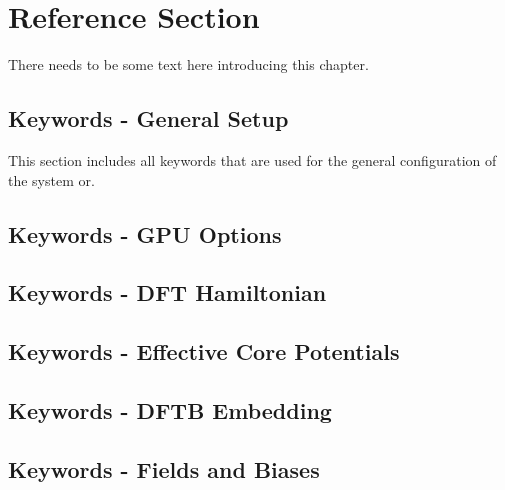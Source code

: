 \chapter{Reference Section}

There needs to be some text here introducing this chapter.

\section{Keywords - General Setup}

This section includes all keywords that are used for
the general configuration of the system or.


\newpage
\section{Keywords - GPU Options}


\newpage
\section{Keywords - DFT Hamiltonian}


\newpage
\section{Keywords - Effective Core Potentials}


\newpage
\section{Keywords - DFTB Embedding}


\newpage
\section{Keywords - Fields and Biases}


\newpage
